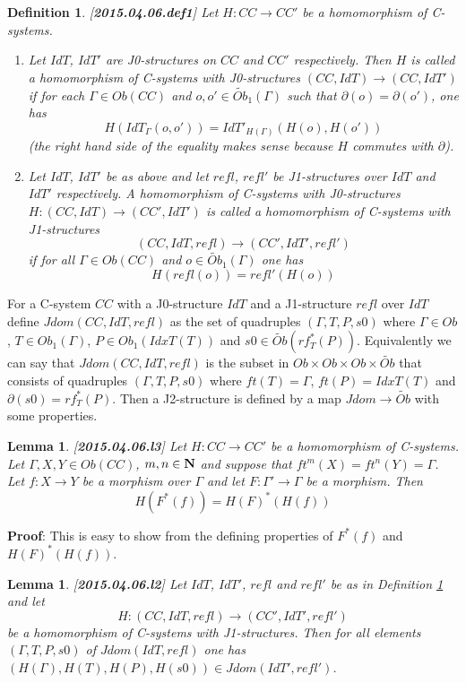 \documentclass[12pt]{article}
\newenvironment{myproof}{{\bf Proof}:}{\vskip 5mm }
\newtheorem{lemma}[proposition]{Lemma}
\newtheorem{definition}[proposition]{Definition}
\newcommand{\llabel}[1]{\label{#1}[{\bf #1}]}
\newcommand{\sr}{\rightarrow}
\newcommand{\nn}{{\bf N\rm}}
\newcommand{\wt}{\widetilde}
\begin{document}
%
\begin{definition}
\llabel{2015.04.06.def1}
Let $H:CC\sr CC'$ be a homomorphism of C-systems.
%
\begin{enumerate}
\item Let $IdT$, $IdT'$ are J0-structures on $CC$ and $CC'$ respectively.  Then $H$ is called a homomorphism of C-systems with J0-structures $(CC,IdT)\sr (CC,IdT')$ if for each $\Gamma\in Ob(CC)$ and $o,o'\in\wt{Ob}_1(\Gamma)$ such that $\partial(o)=\partial(o')$, one has 
%
$$H(IdT_{\Gamma}(o,o'))=IdT'_{H(\Gamma)}(H(o),H(o'))$$
%
(the right hand side of the equality makes sense because $H$ commutes with $\partial$).
% 
\item Let $IdT$, $IdT'$ be as above and let $refl$, $refl'$ be J1-structures over $IdT$ and $IdT'$ respectively. A homomorphism of C-systems with J0-structures $H:(CC,IdT)\sr (CC',IdT')$ is called a homomorphism of C-systems with J1-structures 
%
$$(CC,IdT,refl)\sr (CC',IdT',refl')$$
%
if for all $\Gamma\in Ob(CC)$ and $o\in \wt{Ob}_1(\Gamma)$ one has
%
$$H(refl(o))=refl'(H(o))$$
%
\end{enumerate}
\end{definition}
%
For a C-system $CC$ with a J0-structure $IdT$ and a J1-structure $refl$ over $IdT$ define $Jdom(CC,IdT,refl)$ as the set of quadruples $(\Gamma,T,P,s0)$ where $\Gamma\in Ob$, $T\in Ob_1(\Gamma)$, $P\in Ob_1(IdxT(T))$ and $s0\in \wt{Ob}(rf_T^*(P))$. Equivalently we can say that $Jdom(CC,IdT,refl)$ is the subset in $Ob\times Ob\times Ob\times \wt{Ob}$ that consists of quadruples $(\Gamma,T,P,s0)$ where $ft(T)=\Gamma$, $ft(P)=IdxT(T)$ and $\partial(s0)=rf_T^*(P)$. Then a J2-structure is defined by a map $Jdom\sr \wt{Ob}$ with some properties.
%
\begin{lemma}
\llabel{2015.04.06.l3}
Let $H:CC\sr CC'$ be a homomorphism of C-systems. Let $\Gamma,X,Y\in Ob(CC)$, $m,n\in\nn$ and suppose that $ft^m(X)=ft^{n}(Y)=\Gamma$. Let $f:X\sr Y$ be a morphism over $\Gamma$ and let $F:\Gamma'\sr \Gamma$ be a morphism. Then 
%
$$H(F^*(f))=H(F)^*(H(f))$$
%
\end{lemma}
%
\begin{myproof}
This is easy to show from the defining properties of $F^*(f)$ and $H(F)^*(H(f))$.
\end{myproof}
%
%
\begin{lemma}
\llabel{2015.04.06.l2}
Let $IdT$, $IdT'$, $refl$ and $refl'$ be as in Definition \ref{2015.04.06.def1} and let 
%
$$H:(CC,IdT,refl)\sr (CC',IdT',refl')$$
%
be a homomorphism of C-systems with J1-structures. Then for all elements $(\Gamma,T,P,s0)$ of  $Jdom(IdT,refl)$ one has $(H(\Gamma),H(T),H(P),H(s0))\in Jdom(IdT',refl')$.
\end{lemma}
\end{document}

